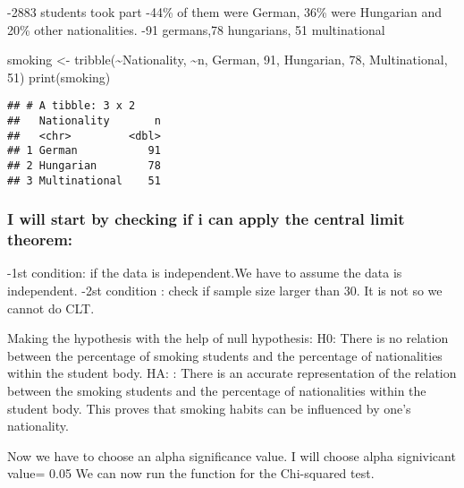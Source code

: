 \documentclass[
]{article}
\newenvironment{Shaded}{\begin{snugshade}}{\end{snugshade}}
\newcommand{\DecValTok}[1]{\textcolor[rgb]{0.00,0.00,0.81}{#1}}
\newcommand{\FunctionTok}[1]{\textcolor[rgb]{0.00,0.00,0.00}{#1}}
\newcommand{\NormalTok}[1]{#1}
\newcommand{\OtherTok}[1]{\textcolor[rgb]{0.56,0.35,0.01}{#1}}
\newcommand{\SpecialCharTok}[1]{\textcolor[rgb]{0.00,0.00,0.00}{#1}}
\newcommand{\StringTok}[1]{\textcolor[rgb]{0.31,0.60,0.02}{#1}}
\begin{document}
-2883 students took part -44\% of them were German, 36\% were Hungarian
and 20\% other nationalities. -91 germans,78 hungarians, 51
multinational

\begin{Shaded}
\begin{Highlighting}[]
\NormalTok{smoking }\OtherTok{\textless{}{-}} \FunctionTok{tribble}\NormalTok{(}\SpecialCharTok{\textasciitilde{}}\StringTok{\textquotesingle{}Nationality\textquotesingle{}}\NormalTok{, }\SpecialCharTok{\textasciitilde{}}\StringTok{\textquotesingle{}n\textquotesingle{}}\NormalTok{, }
\StringTok{\textquotesingle{}German\textquotesingle{}}\NormalTok{, }\DecValTok{91}\NormalTok{,}
\StringTok{\textquotesingle{}Hungarian\textquotesingle{}}\NormalTok{, }\DecValTok{78}\NormalTok{,}
\StringTok{\textquotesingle{}Multinational\textquotesingle{}}\NormalTok{, }\DecValTok{51}\NormalTok{)}
\FunctionTok{print}\NormalTok{(smoking)}
\end{Highlighting}
\end{Shaded}

\begin{verbatim}
## # A tibble: 3 x 2
##   Nationality       n
##   <chr>         <dbl>
## 1 German           91
## 2 Hungarian        78
## 3 Multinational    51
\end{verbatim}

\hypertarget{i-will-start-by-checking-if-i-can-apply-the-central-limit-theorem}{%
\subsubsection{I will start by checking if i can apply the central limit
theorem:}\label{i-will-start-by-checking-if-i-can-apply-the-central-limit-theorem}}

-1st condition: if the data is independent.We have to assume the data is
independent. -2st condition : check if sample size larger than 30. It is
not so we cannot do CLT.

Making the hypothesis with the help of null hypothesis: H0: There is no
relation between the percentage of smoking students and the percentage
of nationalities within the student body. HA: : There is an accurate
representation of the relation between the smoking students and the
percentage of nationalities within the student body. This proves that
smoking habits can be influenced by one's nationality.

Now we have to choose an alpha significance value. I will choose alpha
signivicant value= 0.05 We can now run the function for the Chi-squared
test.
\end{document}
